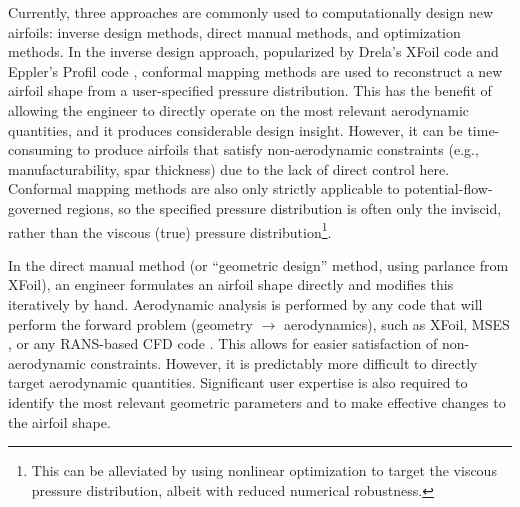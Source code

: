 \documentclass[journal]{new-aiaa}
\begin{document}
Currently, three approaches are commonly used to computationally design new airfoils: inverse design methods, direct manual methods, and optimization methods. In the inverse design approach, popularized by Drela's XFoil code \cite{drelaXFOILAnalysisDesign1989} and Eppler's Profil code \cite{profil, tao_bs_thesis}, conformal mapping methods are used to reconstruct a new airfoil shape from a user-specified pressure distribution. This has the benefit of allowing the engineer to directly operate on the most relevant aerodynamic quantities, and it produces considerable design insight. However, it can be time-consuming to produce airfoils that satisfy non-aerodynamic constraints (e.g., manufacturability, spar thickness) due to the lack of direct control here. Conformal mapping methods are also only strictly applicable to potential-flow-governed regions, so the specified pressure distribution is often only the inviscid, rather than the viscous (true) pressure distribution\footnote{This can be alleviated by using nonlinear optimization to target the viscous pressure distribution, albeit with reduced numerical robustness.}.

In the direct manual method (or ``geometric design'' method, using parlance from XFoil), an engineer formulates an airfoil shape directly and modifies this iteratively by hand. Aerodynamic analysis is performed by any code that will perform the forward problem (geometry $\rightarrow$ aerodynamics), such as XFoil, MSES \cite{mses}, or any RANS-based CFD code \cite{adlerCFDNotCFD2022}. This allows for easier satisfaction of non-aerodynamic constraints. However, it is predictably more difficult to directly target aerodynamic quantities. Significant user expertise is also required to identify the most relevant geometric parameters and to make effective changes to the airfoil shape.
\end{document}
